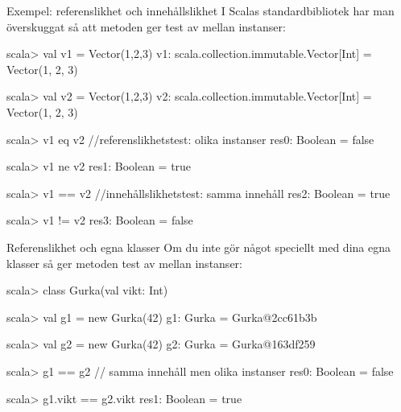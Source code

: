 \begin{Slide}{Exempel: referenslikhet och innehållslikhet}
I Scalas standardbibliotek har man överskuggat  så att metoden \code{==} ger test av  mellan instanser:
\begin{REPL}
scala> val v1 = Vector(1,2,3)
v1: scala.collection.immutable.Vector[Int] = Vector(1, 2, 3)

scala> val v2 = Vector(1,2,3)
v2: scala.collection.immutable.Vector[Int] = Vector(1, 2, 3)

scala> v1 eq v2                //referenslikhetstest: olika instanser
res0: Boolean = false

scala> v1 ne v2
res1: Boolean = true

scala> v1 == v2                //innehållslikhetstest: samma innehåll
res2: Boolean = true

scala> v1 != v2
res3: Boolean = false
\end{REPL}
\end{Slide}


\begin{Slide}{Referenslikhet och egna klasser}
Om du inte gör något speciellt med dina egna klasser så ger metoden \code{==} test av  mellan instanser:
\begin{REPLnonum}
scala> class Gurka(val vikt: Int)

scala> val g1 = new Gurka(42)
g1: Gurka = Gurka@2cc61b3b

scala> val g2 = new Gurka(42)
g2: Gurka = Gurka@163df259

scala> g1 == g2       // samma innehåll men olika instanser
res0: Boolean = false

scala> g1.vikt == g2.vikt
res1: Boolean = true
\end{REPLnonum}
\end{Slide}


